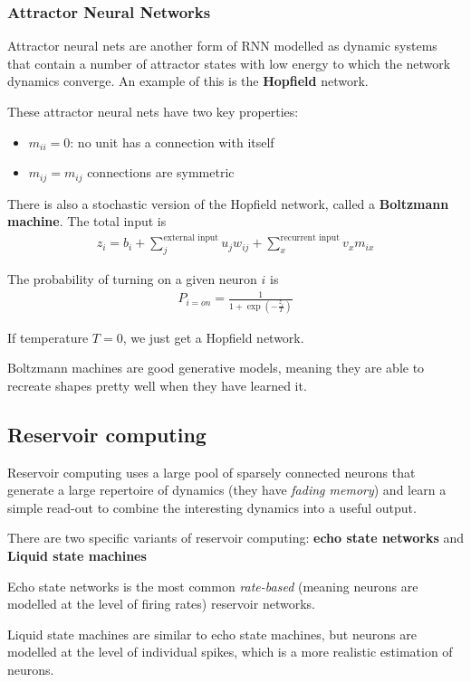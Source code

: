 \documentclass[11pt,a4paper,titlepage,dvipsnames,cmyk]{scrartcl}
\begin{document}
\subsubsection{Attractor Neural Networks}
Attractor neural nets are another form of RNN modelled as dynamic systems that contain a number of attractor states with low energy to which the network dynamics converge. An example of this is the \textbf{Hopfield} network.

These attractor neural nets have two key properties:
\begin{itemize}
    \item $m_{ii} = 0$: no unit has a connection with itself
    \item $m_{ij} = m_{ij}$ connections are symmetric
\end{itemize}

There is also a stochastic version of the Hopfield network, called a \textbf{Boltzmann machine}. The total input is
\begin{align*}
z_i = b_i + \sum_{j}^{\text{external input}} u_jw_{ij} + \sum_{x}^{\text{recurrent input}} v_x m_{ix}
\end{align*}

The probability of turning on a given neuron $i$ is
\begin{align*}
P_{i=on} = \frac{1}{1 + \exp (-\frac{z_i}{T})}
\end{align*}

If temperature $T = 0$, we just get a Hopfield network.

Boltzmann machines are good generative models, meaning they are able to recreate shapes pretty well when they have learned it.

\subsection{Reservoir computing}
Reservoir computing uses a large pool of sparsely connected neurons that generate a large repertoire of dynamics (they have \textit{fading memory}) and learn a simple read-out to combine the interesting dynamics into a useful output.

There are two specific variants of reservoir computing: \textbf{echo state networks} and \textbf{Liquid state machines}

Echo state networks is the most common \textit{rate-based} (meaning neurons are modelled at the level of firing rates) reservoir networks.

Liquid state machines are similar to echo state machines, but neurons are modelled at the level of individual spikes, which is a more realistic estimation of neurons.
\end{document}
